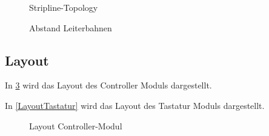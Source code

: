 \begin{figure}[H]
    \centering    
    \caption{Stripline-Topology}
    \label{Stripline}
\end{figure}

\begin{figure}[H]
    \centering    
    \caption{Abstand Leiterbahnen}
    \label{AbstandLeiterbahnen}
\end{figure}


\subsection{Layout}

In  \ref{LayoutController} wird das Layout des Controller Moduls dargestellt.

In  \ref{LayoutTastatur} wird das Layout des Tastatur Moduls dargestellt. 

\begin{figure}[H]
	\centering    
	\caption{Layout Controller-Modul}
	\label{LayoutController}
\end{figure}

